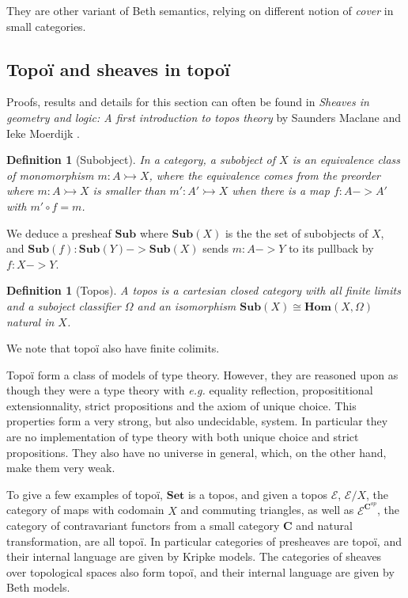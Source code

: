 \documentclass[11pt]{article}
\newtheorem{definition}[theorem]{Definition}
\newcommand{\0}{\mathbf{0}}
\newcommand{\1}{\mathbf{1}}
\newcommand{\mono}{\rightarrowtail}
\begin{document}
They are other variant of Beth semantics, relying on different notion of \emph{cover} in small categories.

\subsection{Topoï and sheaves in topoï}\label{topoi}


Proofs, results and details for this section can often be found in \emph{Sheaves in geometry and logic: A first introduction to topos theory} by Saunders Maclane and Ieke Moerdijk \cite{maclane2012sheaves}.

\begin{definition}[Subobject]
    In a category, a \emph{subobject} of $X$ is an equivalence class of monomorphism $m : A \mono X$, where the equivalence comes from the preorder where $ m : A \mono X $ is smaller than $ m' : A' \mono X$ when there is a map $f : A -> A'$ with $ m' \circ f = m$.
\end{definition}

We deduce a presheaf $\mathbf{Sub}$ where $\mathbf{Sub}(X)$ is the the set of subobjects of $X$, and $\mathbf{Sub}(f) : \mathbf{Sub}(Y) -> \mathbf{Sub}(X)$ sends $m : A -> Y$ to its pullback by $f : X -> Y $. 

\begin{definition}[Topos]\label{topos}
    A \emph{topos} is a cartesian closed category with all finite limits and a suboject \emph{classifier} $\Omega$ and an isomorphism $\mathbf{Sub}(X)\cong \mathbf{Hom}(X, \Omega)$ natural in $X$.
\end{definition}

We note that topoï also have finite colimits.

Topoï form a class of models of type theory.
However, they are reasoned upon as though they were a type theory with \emph{e.g.} equality reflection, proposititional extensionnality, strict propositions and the axiom of unique choice. This properties form a very strong, but also undecidable, system. In particular they are no implementation of type theory with both unique choice and strict propositions. They also have no universe in general, which, on the other hand, make them very weak.


To give a few examples of topoï, $\mathbf{Set}$ is a topos, and given a topos $\mathcal E$, $\mathcal{E}/X$, the category of maps with codomain $X$ and commuting triangles, as well as $\mathcal{E}^{\mathbf{C}^{op}}$, the category of contravariant functors from a small category $\mathbf{C}$ and natural transformation, are all topoï. In particular categories of presheaves are topoï, and their internal language are given by Kripke models. The categories of sheaves over topological spaces also form topoï, and their internal language are given by Beth models.
\end{document}
